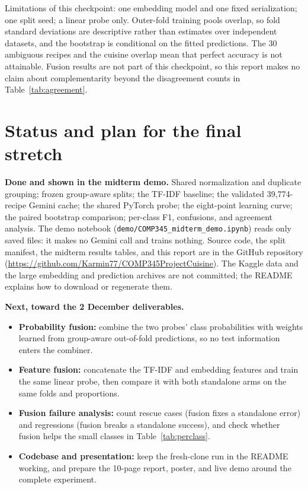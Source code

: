 \documentclass[11pt,letterpaper]{article}
\newcommand{\tfidf}{TF-IDF}
\newcommand{\repolink}{\url{https://github.com/Karmin77/COMP345ProjectCuisine}}
\begin{document}
Limitations of this checkpoint: one embedding model and one fixed serialization; one split seed; a linear probe only. Outer-fold training pools overlap, so fold standard deviations are descriptive rather than estimates over independent datasets, and the bootstrap is conditional on the fitted predictions. The 30 ambiguous recipes and the cuisine overlap mean that perfect accuracy is not attainable. Fusion results are not part of this checkpoint, so this report makes no claim about complementarity beyond the disagreement counts in Table~\ref{tab:agreement}.

\section{Status and plan for the final stretch}
\textbf{Done and shown in the midterm demo.} Shared normalization and duplicate grouping; frozen group-aware splits; the \tfidf{} baseline; the validated 39,774-recipe Gemini cache; the shared PyTorch probe; the eight-point learning curve; the paired bootstrap comparison; per-class F1, confusions, and agreement analysis. The demo notebook (\texttt{demo/COMP345\_midterm\_demo.ipynb}) reads only saved files: it makes no Gemini call and trains nothing. Source code, the split manifest, the midterm results tables, and this report are in the GitHub repository (\repolink). The Kaggle data and the large embedding and prediction archives are not committed; the README explains how to download or regenerate them.

\textbf{Next, toward the 2 December deliverables.}
\begin{itemize}
  \item \textbf{Probability fusion:} combine the two probes' class probabilities with weights learned from group-aware out-of-fold predictions, so no test information enters the combiner.
  \item \textbf{Feature fusion:} concatenate the \tfidf{} and embedding features and train the same linear probe, then compare it with both standalone arms on the same folds and proportions.
  \item \textbf{Fusion failure analysis:} count rescue cases (fusion fixes a standalone error) and regressions (fusion breaks a standalone success), and check whether fusion helps the small classes in Table~\ref{tab:perclass}.
  \item \textbf{Codebase and presentation:} keep the fresh-clone run in the README working, and prepare the 10-page report, poster, and live demo around the complete experiment.
\end{itemize}
\end{document}
